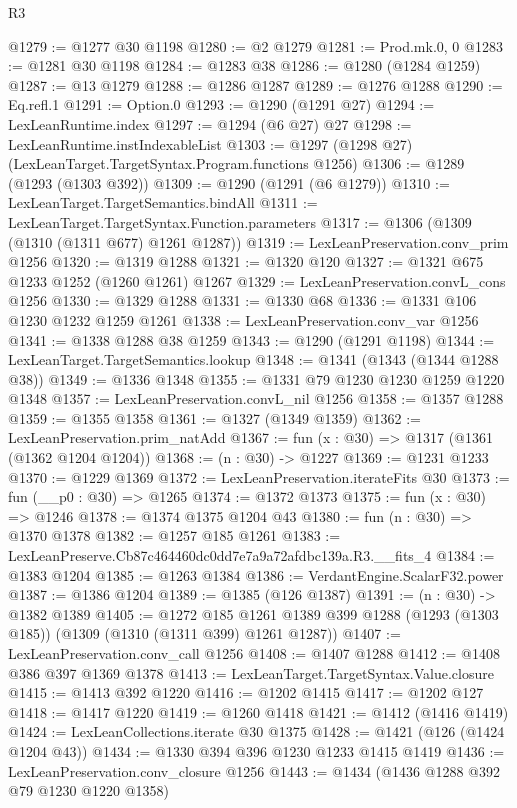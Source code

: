 \begin{lexlean}{R3}
\begin{coremodule}
@1279 := @1277 @30 @1198
@1280 := @2 @1279
@1281 := Prod.mk.{0, 0}
@1283 := @1281 @30 @1198
@1284 := @1283 @38
@1286 := @1280 (@1284 @1259)
@1287 := @13 @1279
@1288 := @1286 @1287
@1289 := @1276 @1288
@1290 := Eq.refl.{1}
@1291 := Option.{0}
@1293 := @1290 (@1291 @27)
@1294 := LexLeanRuntime.index
@1297 := @1294 (@6 @27) @27
@1298 := LexLeanRuntime.instIndexableList
@1303 := @1297 (@1298 @27) (LexLeanTarget.TargetSyntax.Program.functions @1256)
@1306 := @1289 (@1293 (@1303 @392))
@1309 := @1290 (@1291 (@6 @1279))
@1310 := LexLeanTarget.TargetSemantics.bindAll
@1311 := LexLeanTarget.TargetSyntax.Function.parameters
@1317 := @1306 (@1309 (@1310 (@1311 @677) @1261 @1287))
@1319 := LexLeanPreservation.conv_prim @1256
@1320 := @1319 @1288
@1321 := @1320 @120
@1327 := @1321 @675 @1233 @1252 (@1260 @1261) @1267
@1329 := LexLeanPreservation.convL_cons @1256
@1330 := @1329 @1288
@1331 := @1330 @68
@1336 := @1331 @106 @1230 @1232 @1259 @1261
@1338 := LexLeanPreservation.conv_var @1256
@1341 := @1338 @1288 @38 @1259
@1343 := @1290 (@1291 @1198)
@1344 := LexLeanTarget.TargetSemantics.lookup
@1348 := @1341 (@1343 (@1344 @1288 @38))
@1349 := @1336 @1348
@1355 := @1331 @79 @1230 @1230 @1259 @1220 @1348
@1357 := LexLeanPreservation.convL_nil @1256
@1358 := @1357 @1288
@1359 := @1355 @1358
@1361 := @1327 (@1349 @1359)
@1362 := LexLeanPreservation.prim_natAdd
@1367 := fun (x : @30) => @1317 (@1361 (@1362 @1204 @1204))
@1368 := (n : @30) -> @1227
@1369 := @1231 @1233
@1370 := @1229 @1369
@1372 := LexLeanPreservation.iterateFits @30
@1373 := fun (__p0 : @30) => @1265
@1374 := @1372 @1373
@1375 := fun (x : @30) => @1246
@1378 := @1374 @1375 @1204 @43
@1380 := fun (n : @30) => @1370 @1378
@1382 := @1257 @185 @1261
@1383 := LexLeanPreserve.Cb87c464460dc0dd7e7a9a72afdbc139a.R3.__fits_4
@1384 := @1383 @1204
@1385 := @1263 @1384
@1386 := VerdantEngine.ScalarF32.power
@1387 := @1386 @1204
@1389 := @1385 (@126 @1387)
@1391 := (n : @30) -> @1382 @1389
@1405 := @1272
    @185
    @1261
    @1389
    @399
    @1288
    (@1293 (@1303 @185))
    (@1309 (@1310 (@1311 @399) @1261 @1287))
@1407 := LexLeanPreservation.conv_call @1256
@1408 := @1407 @1288
@1412 := @1408 @386 @397 @1369 @1378
@1413 := LexLeanTarget.TargetSyntax.Value.closure
@1415 := @1413 @392 @1220
@1416 := @1202 @1415
@1417 := @1202 @127
@1418 := @1417 @1220
@1419 := @1260 @1418
@1421 := @1412 (@1416 @1419)
@1424 := LexLeanCollections.iterate @30 @1375
@1428 := @1421 (@126 (@1424 @1204 @43))
@1434 := @1330 @394 @396 @1230 @1233 @1415 @1419
@1436 := LexLeanPreservation.conv_closure @1256
@1443 := @1434 (@1436 @1288 @392 @79 @1230 @1220 @1358)

\end{coremodule}
\end{lexlean}
